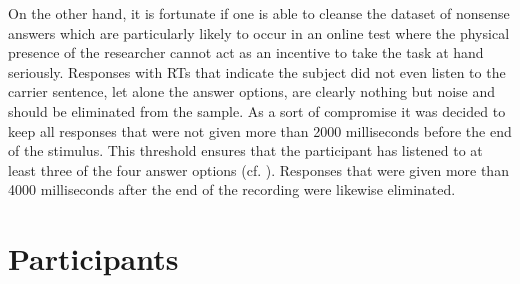On the other hand, it is fortunate if one is able to cleanse the dataset of nonsense answers which are particularly likely to occur in an online test where the physical presence of the researcher cannot act as an incentive to take the task at hand seriously.
Responses with RTs that indicate the subject did not even listen to the carrier sentence, let alone the answer options, are clearly nothing but noise and should be eliminated from the sample.
As a sort of compromise it was decided to keep all responses that were not given more than 2000 milliseconds before the end of the stimulus.
This threshold ensures that the participant has listened to at least three of the four answer options (cf. ).
Responses that were given more than 4000 milliseconds after the end of the recording were likewise eliminated.

\section{Participants}\label{sec.perc_method.subjects}

